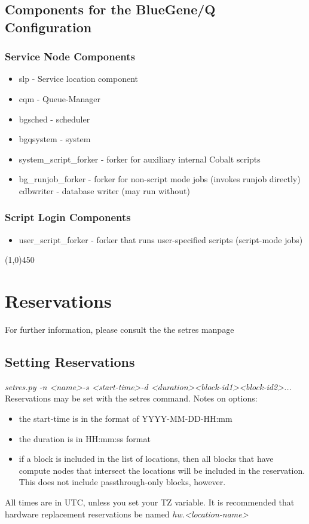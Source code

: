 \documentclass[10pt,letterpaper]{article}
\begin{document}
\subsection*{Components for the BlueGene/Q Configuration}
\subsubsection*{Service Node Components}
\begin{itemize}
\item slp - Service location component
\item cqm - Queue-Manager
\item bgsched - scheduler
\item bgqsystem - system
\item system\_script\_forker - forker for auxiliary internal Cobalt scripts
\item bg\_runjob\_forker - forker for non-script mode jobs (invokes runjob
 directly)
 cdbwriter - database writer (may run without)
\end{itemize}
\subsubsection*{Script Login Components}
\begin{itemize}
\item user\_script\_forker - forker that runs user-specified scripts (script-mode jobs)
\end{itemize}
\begin{center}
\line(1,0){450}
\end{center}
\section*{Reservations}
For further information, please consult the the setres manpage
\subsection*{Setting Reservations}
\textit{setres.py -n \textless name\textgreater -s \textless start-time\textgreater -d \textless duration\textgreater \textless block-id1\textgreater \textless block-id2\textgreater ...}
Reservations may be set with the setres command.  Notes on options:
\begin{itemize}
\item the start-time is in the format of YYYY-MM-DD-HH:mm
\item the duration is in HH:mm:ss format
\item if a block is included in the list of locations, then all blocks that have compute nodes that intersect the locations will be included in the reservation.  This does not include passthrough-only blocks, however. 
\end{itemize}
All times are in UTC, unless you set your TZ variable. It is recommended that hardware replacement reservations be named \textit{hw.\textless location-name\textgreater}  
\end{document}
